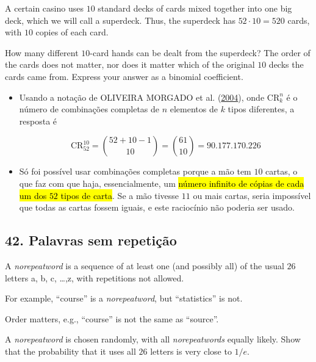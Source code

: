 \documentclass[
  11pt]{report}
\begin{document}
\begin{rmdbox}
A certain casino uses $10$ standard decks of cards mixed together into one big deck, which we will call a superdeck. Thus, the superdeck has $52 \cdot 10 = 520$ cards, with $10$ copies of each card.

How many different $10$-card hands can be dealt from the superdeck? The order of the cards does not matter, nor does it matter which of the original $10$ decks the cards came from. Express your answer as a binomial coefficient.

\end{rmdbox}

\begin{itemize}
\item
  Usando a notação de OLIVEIRA MORGADO et al. (\protect\hyperlink{ref-oliveira-2004-analis}{2004}), onde $\text{CR}_k^n$ é o número de combinações completas de $n$ elementos de $k$ tipos diferentes, a resposta é

  \[
  \text{CR}_{52}^{10} = \binom{52 + 10 - 1}{10} = \binom{61}{10} =
  90.177.170.226
  \]
\item
  Só foi possível usar combinações completas porque a mão tem $10$ cartas, o que faz com que haja, essencialmente, um {\hl{número infinito de cópias de cada um dos $52$ tipos de carta}}. Se a mão tivesse $11$ ou mais cartas, seria impossível que todas as cartas fossem iguais, e este raciocínio não poderia ser usado.
\end{itemize}

\hypertarget{palavras-sem-repetiuxe7uxe3o}{%
\subsection*{42. Palavras sem repetição}\label{palavras-sem-repetiuxe7uxe3o}}

\begin{rmdbox}
A \emph{norepeatword} is a sequence of at least one (and possibly all) of the usual $26$ letters a, b, c, \ldots,z, with repetitions not allowed.

For example, ``course'' is a \emph{norepeatword}, but ``statistics'' is not.

Order matters, e.g., ``course'' is not the same as ``source''.

A \emph{norepeatword} is chosen randomly, with all \emph{norepeatwords} equally likely. Show that the probability that it uses all $26$ letters is very close to $1/e$.

\end{rmdbox}
\end{document}
